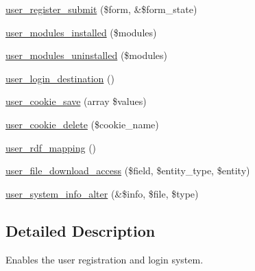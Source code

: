 \begin{DoxyCompactItemize}
\item 
\hyperlink{user_8module_ad104f5427b9f52630164ef58808ad037}{user\_\-register\_\-submit} (\$form, \&\$form\_\-state)
\item 
\hyperlink{user_8module_ab57c127a7196e57c6858e8ebac02e8f2}{user\_\-modules\_\-installed} (\$modules)
\item 
\hyperlink{user_8module_a2eeb0c76aaabb3e178ab069c4f88fc1f}{user\_\-modules\_\-uninstalled} (\$modules)
\item 
\hyperlink{user_8module_ae7cf007030b2bfa8f13d0b18b142a154}{user\_\-login\_\-destination} ()
\item 
\hyperlink{user_8module_a530af19399abbe704a0ebe37a3cc13e4}{user\_\-cookie\_\-save} (array \$values)
\item 
\hyperlink{user_8module_a9a5f709dee676b6395c7e0c2c17c2512}{user\_\-cookie\_\-delete} (\$cookie\_\-name)
\item 
\hyperlink{user_8module_a8c78debb117144a12195c59dc76d7f01}{user\_\-rdf\_\-mapping} ()
\item 
\hyperlink{user_8module_a60c0db0f629d04f71229798339e155fb}{user\_\-file\_\-download\_\-access} (\$field, \$entity\_\-type, \$entity)
\item 
\hyperlink{user_8module_a4fc928f2162969ae4331773ff226e3ec}{user\_\-system\_\-info\_\-alter} (\&\$info, \$file, \$type)
\end{DoxyCompactItemize}


\subsection{Detailed Description}
Enables the user registration and login system. 

